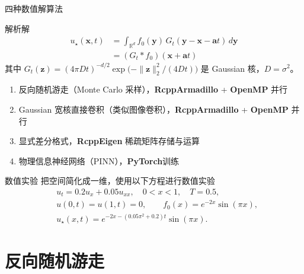 \documentclass[UTF8,aspectratio=169,10pt]{ctexbeamer}
\begin{document}
\begin{frame}{四种数值解算法}
      \begin{exampleblock}{解析解}
            \[
            \begin{aligned}
                  u_{\star}(\boldsymbol{x},t)
                  &=\int_{\mathbb R^d}f_0(\boldsymbol{y})\,
                    G_t(\boldsymbol{y}-\boldsymbol{x}-\boldsymbol{a}t)\,d\boldsymbol{y}\\
                  &=(G_t \ast f_0)(\boldsymbol{x} + \boldsymbol{a}t)
            \end{aligned}
            \]
            {\small 其中 $G_t(\boldsymbol{z})=(4\pi Dt)^{-d/2}\exp\bigl(-\|\boldsymbol{z}\|_2^2/(4Dt)\bigr)$
            是 Gaussian 核，$D=\sigma^2$。}
      \end{exampleblock}
      \begin{enumerate}
            \item 反向随机游走（Monte Carlo 采样），\textbf{RcppArmadillo} + \textbf{OpenMP} 并行
            \item Gaussian 宽核直接卷积（类似图像卷积），\textbf{RcppArmadillo} + \textbf{OpenMP} 并行
            \item 显式差分格式，\textbf{RcppEigen} 稀疏矩阵存储与运算
            \item 物理信息神经网络（PINN），\textbf{PyTorch}训练
      \end{enumerate}
      
\end{frame}
\begin{frame}{数值实验}
把空间简化成一维，使用以下方程进行数值实验
\begin{align*}
& u_t = 0.2u_x + 0.05u_{xx}, \quad 0 < x < 1, \quad T = 0.5, \\
& u(0,t)=u(1,t)=0, \qquad f_0(x)=e^{-2x}\sin(\pi x), \\
& u_{\star}(x,t)=e^{-2x-(0.05\pi^2+0.2)t}\sin(\pi x).
\end{align*}

\end{frame}

\section{反向随机游走}
\end{document}
